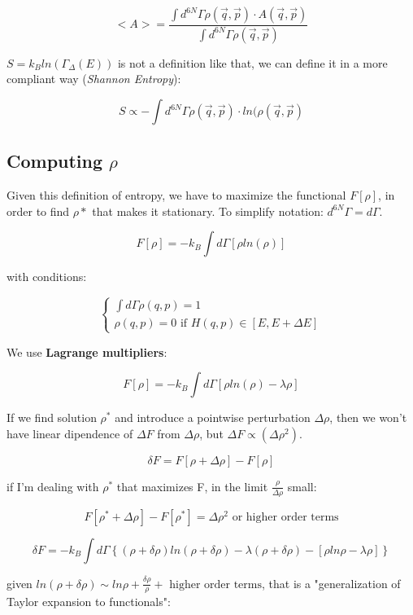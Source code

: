 \documentclass[a4paper, italian, openany]{book}
\begin{document}
$$<A> = \frac{\int d^{6N}\Gamma \rho(\overrightarrow{q}, \overrightarrow{p})\cdot A(\overrightarrow{q}, \overrightarrow{p})}{\int d^{6N}\Gamma \rho(\overrightarrow{q}, \overrightarrow{p})}$$

$S = k_B ln(\Gamma_\Delta (E))$ is not a definition like that, we can define it in a more compliant way (\textit{Shannon Entropy}):

$$S \propto - \int d^{6N} \Gamma \rho(\overrightarrow{q}, \overrightarrow{p}) \cdot ln( \rho(\overrightarrow{q}, \overrightarrow{p})$$

\subsection{Computing $\rho$}

Given this definition of entropy, we have to maximize the functional $F\left [ \rho \right ]$, in order to find $\rho*$ that makes it stationary. To simplify notation: $d^{6N}\Gamma = d\Gamma$.

$$F \left [ \rho \right ] = -k_B \int d\Gamma \left [ \rho ln(\rho) \right ]$$

with conditions:

$$\begin{cases}
\int d\Gamma \rho(q, p) = 1\\
\rho(q, p) = 0 \mbox{ if } H(q, p) \in \left [ E, E+\Delta E \right ]
\end{cases}
$$

We use \textbf{Lagrange multipliers}:

$$F\left [ \rho \right ] = -k_B \int d\Gamma \left [ \rho ln(\rho) -\lambda \rho \right ]$$

If we find solution $\rho^*$ and introduce a pointwise perturbation $\Delta \rho$, then we won't have linear dipendence of $\Delta F$ from $\Delta \rho$, but $\Delta F \propto (\Delta \rho^2)$.

$$\delta F = F[\rho +\Delta \rho] - F[\rho]$$ 

if I'm dealing with $\rho^*$ that maximizes F, in the limit $\frac{\rho}{\Delta\rho}$ small:

$$F[\rho^* +\Delta \rho] - F[\rho^*] = \Delta \rho^2 \mbox{ or higher order terms}$$ 

$$\delta F = -k_B \int d\Gamma \left \{ (\rho + \delta \rho)ln(\rho + \delta \rho) - \lambda (\rho +\delta \rho) - [\rho ln \rho -\lambda \rho] \right \}$$

given $ln(\rho + \delta \rho) \sim ln\rho + \frac{\delta \rho}{\rho} + \mbox{ higher order terms}$, that is a "generalization of Taylor expansion to functionals":
\end{document}
